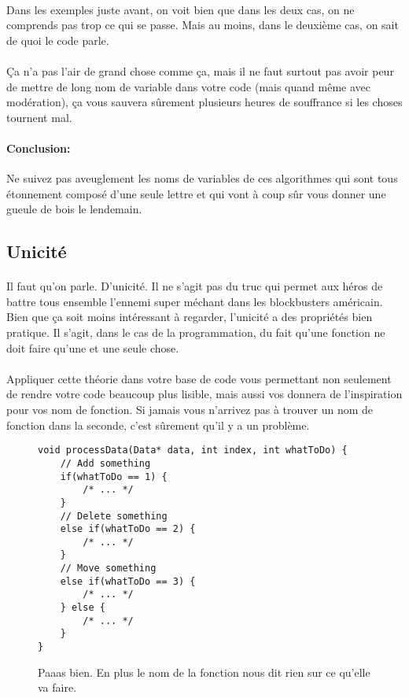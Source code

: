\paragraph{} Dans les exemples juste avant, on voit bien que dans les deux cas,
on ne comprends pas trop ce qui se passe. Mais au moins, dans le deuxième cas,
on sait de quoi le code parle.

\paragraph{} Ça n'a pas l'air de grand chose comme ça, mais il ne faut surtout
pas avoir peur de mettre de long nom de variable dans votre code (mais quand
même avec modération), ça vous sauvera sûrement plusieurs heures de souffrance
si les choses tournent mal.

\paragraph{Conclusion:} Ne suivez pas aveuglement les noms de variables de ces
algorithmes qui sont tous étonnement composé d'une seule lettre et qui vont à
coup sûr vous donner une gueule de bois le lendemain.

\subsection{Unicité}

\paragraph{} Il faut qu'on parle. D'unicité. Il ne s'agit pas du truc qui
permet aux héros de battre tous ensemble l'ennemi super méchant dans les
blockbusters américain. Bien que ça soit moins intéressant à regarder,
l'unicité a des propriétés bien pratique. Il s'agit, dans le cas de la
programmation, du fait qu'une fonction ne doit faire qu'une et une seule chose.

\paragraph{} Appliquer cette théorie dans votre base de code vous permettant
non seulement de rendre votre code beaucoup plus lisible, mais aussi vos
donnera de l'inspiration pour vos nom de fonction. Si jamais vous n'arrivez pas
à trouver un nom de fonction dans la seconde, c'est sûrement qu'il y a un
problème.

\begin{figure}[H]
	\centering
	\begin{verbatim}
void processData(Data* data, int index, int whatToDo) {
	// Add something
	if(whatToDo == 1) {
		/* ... */
	}
	// Delete something
	else if(whatToDo == 2) {
		/* ... */
	}
	// Move something
	else if(whatToDo == 3) {
		/* ... */
	} else {
		/* ... */
	}
}
	\end{verbatim}
	\caption{Paaas bien. En plus le nom de la fonction nous dit rien sur ce
		qu'elle va faire.}
\end{figure}

